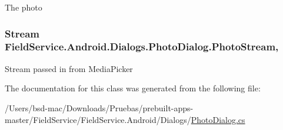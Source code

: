 The photo 

\hypertarget{class_field_service_1_1_android_1_1_dialogs_1_1_photo_dialog_adccf035208f9cf547bc6fd484a721558}{
\subsubsection[{Photo\+Stream}]{\setlength{\rightskip}{0pt plus 5cm}Stream Field\+Service.\+Android.\+Dialogs.\+Photo\+Dialog.\+Photo\+Stream\hspace{0.3cm}{\ttfamily [get]}, {\ttfamily [set]}}}\label{class_field_service_1_1_android_1_1_dialogs_1_1_photo_dialog_adccf035208f9cf547bc6fd484a721558}


Stream passed in from Media\+Picker 



The documentation for this class was generated from the following file\+:\begin{DoxyCompactItemize}
\item 
/\+Users/bsd-\/mac/\+Downloads/\+Pruebas/prebuilt-\/apps-\/master/\+Field\+Service/\+Field\+Service.\+Android/\+Dialogs/\hyperlink{_photo_dialog_8cs}{Photo\+Dialog.\+cs}\end{DoxyCompactItemize}
